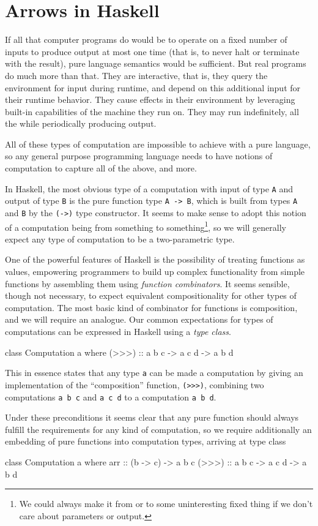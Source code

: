 \section{Arrows in Haskell}

If all that computer programs do would be to operate on a fixed number of inputs
to produce output at most one time (that is, to never halt or terminate with
the result), pure language semantics would be sufficient. But real programs do
much more than that. They are interactive, that is, they query the environment
for input during runtime, and depend on this additional input for their runtime
behavior. They cause effects in their environment by leveraging built-in
capabilities of the machine they run on. They may run indefinitely, all the
while periodically producing output.

All of these types of computation are impossible to achieve with a pure
language, so any general purpose programming language needs to have notions of
computation to capture all of the above, and more.

In Haskell, the most obvious type of a computation with input of type \verb|A|
and output of type \verb|B| is the pure function type \verb|A -> B|, which is
built from types \verb|A| and \verb|B| by the \verb|(->)| type constructor. It
seems to make sense to adopt this notion of a computation being from something
to something\footnote{We could always make it from or to some uninteresting
fixed thing if we don't care about parameters or output.}, so we will generally
expect any type of computation to be a two-parametric type.

One of the powerful features of Haskell is the possibility of treating functions
as values, empowering programmers to build up complex functionality from simple
functions by assembling them using \emph{function combinators}. It seems
sensible, though not necessary, to expect equivalent compositionality for other
types of computation. The most basic kind of combinator for functions is
composition, and we will require an analogue. Our common expectations for types
of computations can be expressed in Haskell using a \emph{type class}.

\begin{code}
class Computation a where
    (>>>) :: a b c -> a c d -> a b d
\end{code}

This in essence states that any type \verb|a| can be made a computation by
giving an implementation of the ``composition'' function, \verb|(>>>)|,
combining two computations \verb|a b c| and \verb|a c d| to a computation
\verb|a b d|.

Under these preconditions it seems clear that any pure function should always
fulfill the requirements for any kind of computation, so we require additionally
an embedding of pure functions into computation types, arriving at type class

\begin{code}
class Computation a where
    arr   :: (b -> c) -> a b c
    (>>>) :: a b c -> a c d -> a b d
\end{code}
